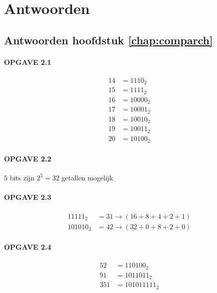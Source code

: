 \chapter{Antwoorden}
\label{chap:antwoorden}

\section{Antwoorden hoofdstuk \ref{chap:comparch}}

\subsubsection{OPGAVE 2.1}

\begin{align*}
14 &= 1110_2\\
15 &= 1111_2\\
16 &= 10000_2\\
17 &= 10001_2\\
18 &= 10010_2\\
19 &= 10011_2\\
20 &= 10100_2
\end{align*}

\subsubsection{OPGAVE 2.2}
$5$ bits zijn $2^5 = 32$ getallen mogelijk

\subsubsection{OPGAVE 2.3}
\begin{align*}
11111_2  &= 31 \rightarrow (16 + 8 + 4 + 2 + 1) \\
101010_2 &= 42 \rightarrow (32 + 0 + 8 + 2 + 0) 
\end{align*}

\subsubsection{OPGAVE 2.4}
\begin{align*}
52  &= 110100_2 \\
91  &= 1011011_2 \\
351 &= 101011111_2 
\end{align*}


